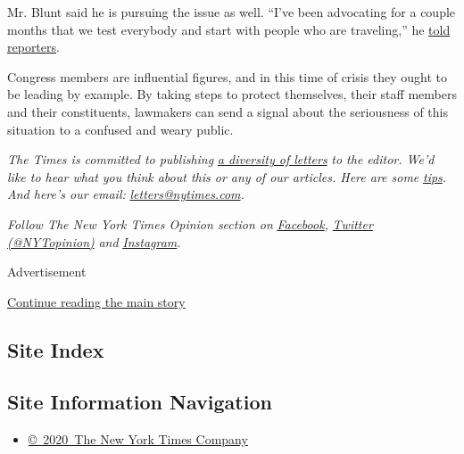 Mr. Blunt said he is pursuing the issue as well. ``I've been advocating
for a couple months that we test everybody and start with people who are
traveling,'' he
\href{https://www.rollcall.com/2020/07/29/louie-gohmert-coronavirus-capitol/}{told
reporters}.

Congress members are influential figures, and in this time of crisis
they ought to be leading by example. By taking steps to protect
themselves, their staff members and their constituents, lawmakers can
send a signal about the seriousness of this situation to a confused and
weary public.

\emph{The Times is committed to publishing}
\href{https://www.nytimes.com/2019/01/31/opinion/letters/letters-to-editor-new-york-times-women.html}{\emph{a
diversity of letters}} \emph{to the editor. We'd like to hear what you
think about this or any of our articles. Here are some}
\href{https://help.nytimes.com/hc/en-us/articles/115014925288-How-to-submit-a-letter-to-the-editor}{\emph{tips}}\emph{.
And here's our email:}
\href{mailto:letters@nytimes.com}{\emph{letters@nytimes.com}}\emph{.}

\emph{Follow The New York Times Opinion section on}
\href{https://www.facebook.com/nytopinion}{\emph{Facebook}}\emph{,}
\href{http://twitter.com/NYTOpinion}{\emph{Twitter (@NYTopinion)}}
\emph{and}
\href{https://www.instagram.com/nytopinion/}{\emph{Instagram}}\emph{.}

Advertisement

\protect\hyperlink{after-bottom}{Continue reading the main story}

\hypertarget{site-index}{%
\subsection{Site Index}\label{site-index}}

\hypertarget{site-information-navigation}{%
\subsection{Site Information
Navigation}\label{site-information-navigation}}

\begin{itemize}
\tightlist
\item
  \href{https://help.nytimes.com/hc/en-us/articles/115014792127-Copyright-notice}{©~2020~The
  New York Times Company}
\end{itemize}

